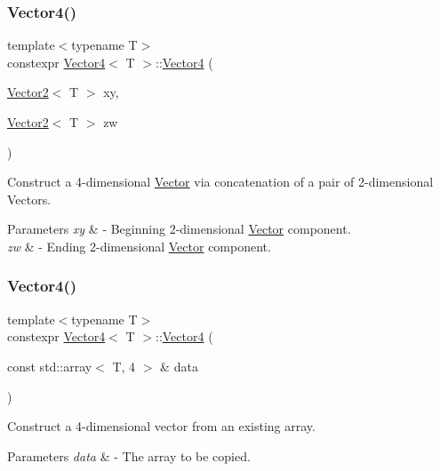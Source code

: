 \subsubsection{\texorpdfstring{Vector4()}{Vector4()}\hspace{0.1cm}{\footnotesize\ttfamily [4/5]}}
{\footnotesize\ttfamily template$<$typename T$>$ \\
constexpr \mbox{\hyperlink{class_vector4}{Vector4}}$<$ T $>$\+::\mbox{\hyperlink{class_vector4}{Vector4}} (\begin{DoxyParamCaption}\item[{\mbox{\hyperlink{class_vector2}{Vector2}}$<$ T $>$}]{xy,  }\item[{\mbox{\hyperlink{class_vector2}{Vector2}}$<$ T $>$}]{zw }\end{DoxyParamCaption})}

Construct a 4-\/dimensional \mbox{\hyperlink{class_vector}{Vector}} via concatenation of a pair of 2-\/dimensional Vectors. 
\begin{DoxyParams}{Parameters}
{\em xy} & -\/ Beginning 2-\/dimensional \mbox{\hyperlink{class_vector}{Vector}} component. \\
\hline
{\em zw} & -\/ Ending 2-\/dimensional \mbox{\hyperlink{class_vector}{Vector}} component. \\
\hline
\end{DoxyParams}
\mbox{\label{class_vector4_a2503315a6418e38bf423c9fb7b33eec3}} 
\subsubsection{\texorpdfstring{Vector4()}{Vector4()}\hspace{0.1cm}{\footnotesize\ttfamily [5/5]}}
{\footnotesize\ttfamily template$<$typename T$>$ \\
constexpr \mbox{\hyperlink{class_vector4}{Vector4}}$<$ T $>$\+::\mbox{\hyperlink{class_vector4}{Vector4}} (\begin{DoxyParamCaption}\item[{const std\+::array$<$ T, 4 $>$ \&}]{data }\end{DoxyParamCaption})}

Construct a 4-\/dimensional vector from an existing array. 
\begin{DoxyParams}{Parameters}
{\em data} & -\/ The array to be copied. \\
\hline
\end{DoxyParams}


